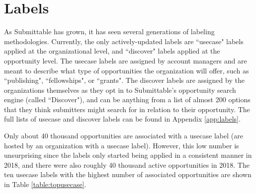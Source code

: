 \documentclass[12pt]{report}   %
\begin{document}
\section{Labels}
As Submittable has grown, it has seen several generations of labeling methodologies. Currently, the only actively-updated labels are ``usecase" labels applied at the organizational level, and ``discover" labels applied at the opportunity level. The usecase labels are assigned by account managers and are meant to describe what type of opportunities the organization will offer, such as ``publishing", ``fellowships", or ``grants". The discover labels are assigned by the organizations themselves as they opt in to Submittable's opportunity search engine (called ``Discover"), and can be anything from a list of almost 200 options that they think submitters might search for in relation to their opportunity. The full lists of usecase and discover labels can be found in Appendix \ref{app:labels}.

Only about 40 thousand opportunities are associated with a usecase label (are hosted by an organization with a usecase label). However, this low number is unsurprising since the labels only started being applied in a consistent manner in 2018, and there were also roughly 40 thousand active opportunities in 2018. The ten usecase labels with the highest number of associated opportunities are shown in Table \ref{table:topusecase}.  
\end{document}
